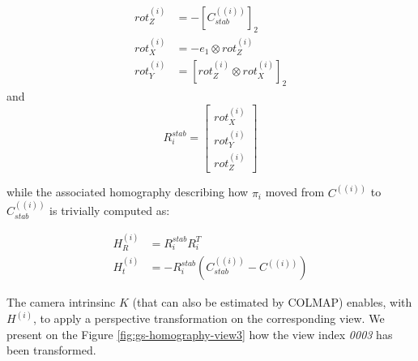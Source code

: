 \begin{equation}
  \begin{split}
    rot^{(i)}_{Z} & = - {\left[C^{((i))}_{stab}\right]}_{2}\\
    rot^{(i)}_{X} & = - e_{1} \otimes rot^{(i)}_{Z} \\
    rot^{(i)}_{Y} & = {\left[rot^{(i)}_{Z}\otimes rot^{(i)}_{X}\right]}_{2}
    \end{split}
\end{equation}
and 
\begin{equation}
R_{i}^{stab}  = \begin{bmatrix}
      rot^{(i)}_{X}\\
      rot^{(i)}_{Y} \\
      rot^{(i)}_{Z}
      \end{bmatrix}
\end{equation}

while the associated homography describing how $\pi_{i}$ moved from $C^{((i))}$ to $C^{((i))}_{stab}$ is trivially computed as: 

\begin{equation}
  \begin{split}
    H_{R}^{(i)} & = R_{i}^{stab}R_{i}^{T} \\
    H_{t}^{(i)} & = - R_{i}^{stab}(C^{((i))}_{stab} - C^{((i))})
  \end{split}
\end{equation}

The camera intrinsinc $K$ (that can also be estimated by COLMAP) enables, with $H^{(i)}$, to apply a perspective transformation on the corresponding view. We present on the Figure \ref{fig:gs-homography-view3} how the view index \textit{0003} has been transformed. 

